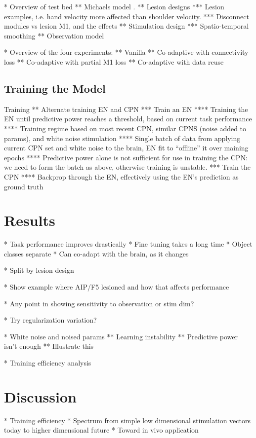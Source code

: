 \documentclass[12pt]{iopart}
\begin{document}
* Overview of test bed
** Michaels model \cite{michaels.mrnn} \cite{susillo.mrnn}.
** Lesion designs
*** Lesion examples, i.e. hand velocity more affected than shoulder velocity.
*** Disconnect modules vs lesion M1, and the effects
** Stimulation design
*** Spatio-temporal smoothing
** Observation model

* Overview of the four experiments:
** Vanilla
** Co-adaptive with connectivity loss
** Co-adaptive with partial M1 loss
** Co-adaptive with data reuse

\subsection{Training the Model}
Training
** Alternate training EN and CPN
*** Train an EN
**** Training the EN until predictive power reaches a threshold, based on current task performance
**** Training regime based on most recent CPN, similar CPNS (noise added to params), and white noise stimulation
**** Single batch of data from applying current CPN set and white noise to the brain, EN fit to ``offline'' it over maining epochs
**** Predictive power alone is not sufficient for use in training the CPN: we need to form the batch as above, otherwise training is unstable.
*** Train the CPN
**** Backprop through the EN, effectively using the EN's prediction as ground truth

\section{Results}

* Task performance improves drastically
* Fine tuning takes a long time
* Object classes separate
* Can co-adapt with the brain, as it changes

* Split by lesion design

* Show example where AIP/F5 lesioned and how that affects performance

* Any point in showing sensitivity to observation or stim dim?

* Try regularization variation?

* White noise and noised params
** Learning instability
** Predictive power isn't enough
** Illustrate this

* Training efficiency analysis

\section{Discussion}
* Training efficiency
* Spectrum from simple low dimensional stimulation vectors today to higher dimensional future
* Toward in vivo application
\end{document}
